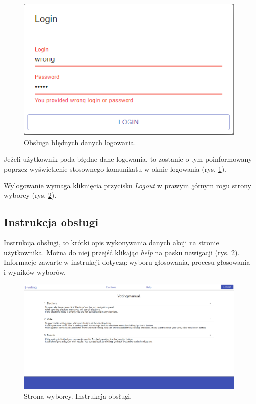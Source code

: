 \documentclass[a4paper,12pt]{book}
\begin{document}
\begin{figure}[h]
	\centering
	\includegraphics{images/errorlogin.png}
	\caption{Obsługa błędnych danych logowania.}\label{wronglogin}
\end {figure}

Jeżeli użytkownik poda błędne dane logowania, to zostanie o tym poinformowany poprzez wyświetlenie stosownego komunikatu w oknie logowania (rys. \ref{wronglogin}). 

\newpage

Wylogowanie wymaga kliknięcia przycisku \textit{Logout} w prawym górnym rogu strony wyborcy (rys. \ref{manual}).

\subsection{Instrukcja obsługi}

Instrukcja obsługi, to krótki opis wykonywania danych akcji na stronie użytkownika. Można do niej przejść klikając \textit{help} na pasku nawigacji (rys. \ref{manual}). Informacje zawarte w instrukcji dotyczą: wyboru głosowania, procesu głosowania i wyników wyborów.

\begin{figure}[H]
	\centering
	\includegraphics[width=\textwidth]{images/manual.png}
	\caption{Strona wyborcy. Instrukcja obsługi.}\label{manual}
\end {figure}
\end{document}
